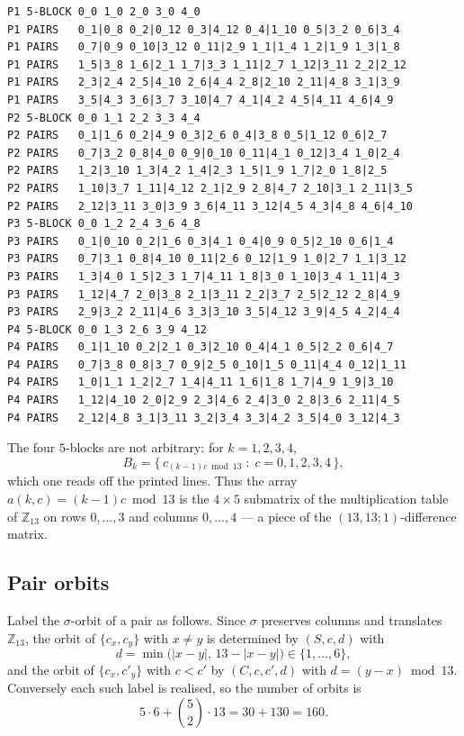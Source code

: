 \documentclass[11pt]{amsart}
\theoremstyle{remark}
\begin{document}
\small
\begin{verbatim}
P1 5-BLOCK 0_0 1_0 2_0 3_0 4_0
P1 PAIRS   0_1|0_8 0_2|0_12 0_3|4_12 0_4|1_10 0_5|3_2 0_6|3_4
P1 PAIRS   0_7|0_9 0_10|3_12 0_11|2_9 1_1|1_4 1_2|1_9 1_3|1_8
P1 PAIRS   1_5|3_8 1_6|2_1 1_7|3_3 1_11|2_7 1_12|3_11 2_2|2_12
P1 PAIRS   2_3|2_4 2_5|4_10 2_6|4_4 2_8|2_10 2_11|4_8 3_1|3_9
P1 PAIRS   3_5|4_3 3_6|3_7 3_10|4_7 4_1|4_2 4_5|4_11 4_6|4_9
P2 5-BLOCK 0_0 1_1 2_2 3_3 4_4
P2 PAIRS   0_1|1_6 0_2|4_9 0_3|2_6 0_4|3_8 0_5|1_12 0_6|2_7
P2 PAIRS   0_7|3_2 0_8|4_0 0_9|0_10 0_11|4_1 0_12|3_4 1_0|2_4
P2 PAIRS   1_2|3_10 1_3|4_2 1_4|2_3 1_5|1_9 1_7|2_0 1_8|2_5
P2 PAIRS   1_10|3_7 1_11|4_12 2_1|2_9 2_8|4_7 2_10|3_1 2_11|3_5
P2 PAIRS   2_12|3_11 3_0|3_9 3_6|4_11 3_12|4_5 4_3|4_8 4_6|4_10
P3 5-BLOCK 0_0 1_2 2_4 3_6 4_8
P3 PAIRS   0_1|0_10 0_2|1_6 0_3|4_1 0_4|0_9 0_5|2_10 0_6|1_4
P3 PAIRS   0_7|3_1 0_8|4_10 0_11|2_6 0_12|1_9 1_0|2_7 1_1|3_12
P3 PAIRS   1_3|4_0 1_5|2_3 1_7|4_11 1_8|3_0 1_10|3_4 1_11|4_3
P3 PAIRS   1_12|4_7 2_0|3_8 2_1|3_11 2_2|3_7 2_5|2_12 2_8|4_9
P3 PAIRS   2_9|3_2 2_11|4_6 3_3|3_10 3_5|4_12 3_9|4_5 4_2|4_4
P4 5-BLOCK 0_0 1_3 2_6 3_9 4_12
P4 PAIRS   0_1|1_10 0_2|2_1 0_3|2_10 0_4|4_1 0_5|2_2 0_6|4_7
P4 PAIRS   0_7|3_8 0_8|3_7 0_9|2_5 0_10|1_5 0_11|4_4 0_12|1_11
P4 PAIRS   1_0|1_1 1_2|2_7 1_4|4_11 1_6|1_8 1_7|4_9 1_9|3_10
P4 PAIRS   1_12|4_10 2_0|2_9 2_3|4_6 2_4|3_0 2_8|3_6 2_11|4_5
P4 PAIRS   2_12|4_8 3_1|3_11 3_2|3_4 3_3|4_2 3_5|4_0 3_12|4_3
\end{verbatim}
\normalsize

\noindent
The four $5$-blocks are not arbitrary: for $k=1,2,3,4$,
\begin{equation}\label{eq:transversal}
 B_k=\bigl\{\,c_{(k-1)c\bmod13}\;:\;c=0,1,2,3,4\,\bigr\},
\end{equation}
which one reads off the printed lines. Thus the array $a(k,c)=(k-1)c\bmod13$ is
the $4\times5$ submatrix of the multiplication table of $\mathbb Z_{13}$ on rows
$0,\dots,3$ and columns $0,\dots,4$ --- a piece of the $(13,13;1)$-difference
matrix.

\subsection*{Pair orbits}
Label the $\sigma$-orbit of a pair as follows. Since $\sigma$ preserves columns
and translates $\mathbb Z_{13}$, the orbit of $\{c_x,c_y\}$ with $x\ne y$ is
determined by $(S,c,d)$ with
\[
 d=\min\bigl(|x-y|,\,13-|x-y|\bigr)\in\{1,\dots,6\},
\]
and the orbit of $\{c_x,c'_y\}$ with $c<c'$ by $(C,c,c',d)$ with
$d=(y-x)\bmod13$. Conversely each such label is realised, so the number of
orbits is
\[
 5\cdot6+\binom52\cdot13=30+130=160 .
\]
\end{document}
